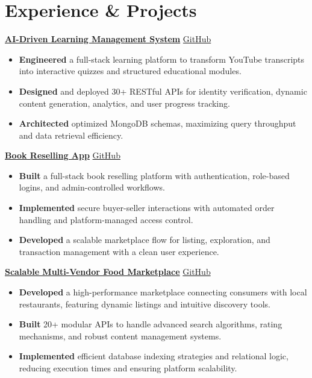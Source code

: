 \documentclass[a4paper,10pt]{article}
\begin{document}
\section*{Experience \& Projects}

\textbf{\href{https://learnstream.netlify.app/}{AI-Driven Learning Management System}} \hfill \href{https://github.com/Saheb142003/LearnStream}{GitHub}
\begin{itemize}
\item \textbf{Engineered} a full-stack learning platform to transform YouTube transcripts into interactive quizzes and structured educational modules.
\item \textbf{Designed} and deployed 30+ RESTful APIs for identity verification, dynamic content generation, analytics, and user progress tracking.
\item \textbf{Architected} optimized MongoDB schemas, maximizing query throughput and data retrieval efficiency.
\end{itemize}

\textbf{\href{https://book-reselling-app.vercel.app/explore}{Book Reselling App}} \hfill \href{https://github.com/Saheb142003/Book-Reselling-App}{GitHub}
\begin{itemize}
\item \textbf{Built} a full-stack book reselling platform with authentication, role-based logins, and admin-controlled workflows.
\item \textbf{Implemented} secure buyer-seller interactions with automated order handling and platform-managed access control.
\item \textbf{Developed} a scalable marketplace flow for listing, exploration, and transaction management with a clean user experience.
\end{itemize}

\textbf{\href{https://cravespace.netlify.app}{Scalable Multi-Vendor Food Marketplace}} \hfill \href{https://github.com/Saheb142003/Restaurant-Management-System}{GitHub}
\begin{itemize}
\item \textbf{Developed} a high-performance marketplace connecting consumers with local restaurants, featuring dynamic listings and intuitive discovery tools.
\item \textbf{Built} 20+ modular APIs to handle advanced search algorithms, rating mechanisms, and robust content management systems.
\item \textbf{Implemented} efficient database indexing strategies and relational logic, reducing execution times and ensuring platform scalability.
\end{itemize}
\end{document}
